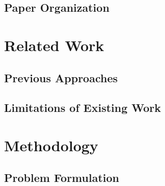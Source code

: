 \documentclass[11pt,a4paper]{article}
\begin{document}
\subsection{Paper Organization}
\label{subsec:organization}


\section{Related Work}
\label{sec:related_work}


\subsection{Previous Approaches}
\label{subsec:previous_approaches}


\subsection{Limitations of Existing Work}
\label{subsec:limitations}


\section{Methodology}
\label{sec:methodology}


\subsection{Problem Formulation}
\label{subsec:formulation}

\end{document}
